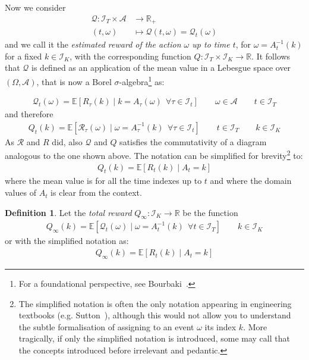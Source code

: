 \documentclass[]{scrartcl}
\theoremstyle{definition}
\newtheorem{definition}{Definition}[section]
\begin{document}
Now we consider
\begin{align*}
    \mathcal{Q} : \mathcal{I}_T \times \mathcal{A} &\longrightarrow \mathbb{R}_{+} \\
        (t, \omega) &\longmapsto \mathcal{Q}(t, \omega) = \mathcal{Q}_t(\omega)
\end{align*}
and we call it the \emph{estimated reward of the action $\omega$ up to time $t$}, for $\omega = A_t^{-1}(k)$ for a fixed $k\in \mathcal{I}_K$, with the corresponding function $Q: \mathcal{I}_T \times \mathcal{I}_K \rightarrow \mathbb{R}$. It follows that $\mathcal{Q}$ is defined as an application of the mean value in a Lebesgue space over $(\Omega, \mathcal{A})$, that is now a Borel $\sigma$-algebra\footnote{
    For a foundational perspective, see Bourbaki~\cite{bourbaki2004integration}.
} as:

\begin{align}\label{def:mathcalQt}
\mathcal{Q}_t(\omega) = \mathbb{E} \left[ R_{\tau}(k)\mid k = A_{\tau}(\omega)~~ \forall \tau \in \mathcal{I}_t \right]
\qquad
\omega \in \mathcal{A}
\qquad
t \in \mathcal{I}_T
\end{align}
and therefore
\begin{align}\label{def:Qt}
Q_t(k) = \mathbb{E} \left[ \mathcal{R}_{\tau}(\omega)\mid \omega = A_{\tau}^{-1}(k)~~ \forall \tau \in \mathcal{I}_t \right]
\qquad
t \in \mathcal{I}_T
\qquad
k \in \mathcal{I}_K
\end{align}
As $\mathcal{R}$ and $R$ did, also $\mathcal{Q}$ and $Q$ satisfies the commutativity of a diagram analogous to the one shown above. The notation can be simplified for brevity\footnote{
    The simplified notation is often the only notation appearing in engineering textbooks (e.g. Sutton~\cite{sutton2018reinforcement}), although this would not allow you to understand the subtle formalisation of assigning to an event $\omega$ its index $k$. More tragically, if only the simplified notation is introduced, some may call that the concepts introduced before irrelevant and pedantic.
} to:
\begin{align}\label{def:mathcalQt_simple}
Q_t(k) = \mathbb{E} \left[ R_{t}(k) \mid A_{t} = k \right]
\end{align}
where the mean value is for all the time indexes up to $t$ and where the domain values of $A_t$ is clear from the context.

\begin{definition}
    Let the \emph{total reward} $Q_{\infty}: \mathcal{I}_K \rightarrow \mathbb{R}$ be the function
    \begin{align}\label{def:mathcalQinf}
    Q_{\infty}(k) = \mathbb{E} \left[ \mathcal{Q}_{t}(\omega) \mid \omega = A^{-1}_{t}(k)~~ \forall t \in \mathcal{I}_T \right]
    \qquad
    k \in \mathcal{I}_K
    \end{align}
    or with the simplified notation as:
    \begin{align}\label{def:mathcalQinf_simple}
    Q_{\infty}(k) = \mathbb{E} \left[ R_{t}(k) \mid A_{t} = k \right]
    \end{align}
\end{definition}
\end{document}

